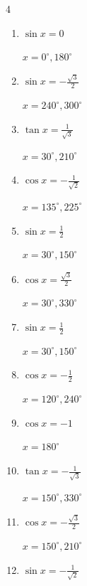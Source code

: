 \begin{multicols}{4}
\begin{enumerate}
        $\displaystyle x = 45^{\circ} , 135^{\circ}$

  \item $\displaystyle \sin{x}  = 0$

        $\displaystyle x = 0^{\circ} , 180^{\circ}$

  \item $\displaystyle \sin{x}  = -\frac{\sqrt{3}}{2}$

        $\displaystyle x = 240^{\circ} , 300^{\circ}$

  \item $\displaystyle \tan{x}  = \frac{1}{\sqrt{3}}$

        $\displaystyle x = 30^{\circ} , 210^{\circ}$

  \item $\displaystyle \cos{x}  = -\frac{1}{\sqrt{2}}$

        $\displaystyle x = 135^{\circ} , 225^{\circ}$

  \item $\displaystyle \sin{x}  = \frac{1}{2}$

        $\displaystyle x = 30^{\circ} , 150^{\circ}$

  \item $\displaystyle \cos{x}  = \frac{\sqrt{3}}{2}$

        $\displaystyle x = 30^{\circ} , 330^{\circ}$

  \item $\displaystyle \sin{x}  = \frac{1}{2}$

        $\displaystyle x = 30^{\circ} , 150^{\circ}$

  \item $\displaystyle \cos{x}  = -\frac{1}{2}$

        $\displaystyle x = 120^{\circ} , 240^{\circ}$

  \item $\displaystyle \cos{x}  = -1$

        $\displaystyle x = 180^{\circ}$

  \item $\displaystyle \tan{x}  = -\frac{1}{\sqrt{3}}$

        $\displaystyle x = 150^{\circ} , 330^{\circ}$

  \item $\displaystyle \cos{x}  = -\frac{\sqrt{3}}{2}$

        $\displaystyle x = 150^{\circ} , 210^{\circ}$

  \item $\displaystyle \sin{x}  = -\frac{1}{\sqrt{2}}$


\end{enumerate}
\end{multicols}
